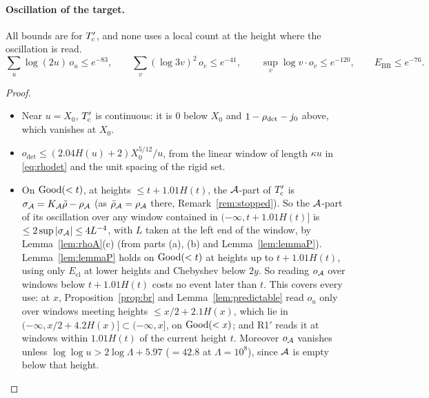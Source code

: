 \paragraph{Oscillation of the target.}\label{par:osc} All bounds are for $T'_{\mathrm{c}}$, and none uses a local count at the height where
the oscillation is read.
\begin{equation}\label{eq:osc}
  \sum_u\log(2u)\,o_u\le e^{-83},\qquad\sum_v(\log3v)^2\,o_v\le e^{-41},\qquad\sup_v\log v\cdot o_v\le e^{-120},
  \qquad E_{\mathrm{BR}}\le e^{-76}.
\end{equation}
\begin{proof}
\begin{itemize}
\item Near $u=X_0$, $T'_{\mathrm{c}}$ is continuous: it is $0$ below $X_0$ and $1-\rho_{\mathrm{det}}-j_0$ above, which vanishes at $X_0$.
\item $o_{\mathrm{det}}\le(2.04H(u)+2)X_0^{5/12}/u$, from the linear window of length $\kappa u$ in \eqref{eq:rhodet} and the
  unit spacing of the rigid set.
\item On $\mathrm{Good}(<t)$, at heights $\le t+1.01H(t)$, the $\mathcal{A}$-part of $T'_{\mathrm{c}}$ is $\sigma_{\mathcal{A}}=K_{\mathcal{A}}\tilde\rho-\rho_{\mathcal{A}}$ (as
  $\bar\rho_{\mathcal{A}}=\rho_{\mathcal{A}}$ there, Remark~\ref{rem:stopped}). So the $\mathcal{A}$-part of its oscillation over any window contained in
  $(-\infty,t+1.01H(t)]$ is $\le2\sup|\sigma_{\mathcal{A}}|\le4L^{-4}$, with $L$ taken at the left end of the window, by
  Lemma~\ref{lem:rhoA}(c) (from parts (a), (b) and Lemma~\ref{lem:lemmaP}). Lemma~\ref{lem:lemmaP} holds on $\mathrm{Good}(<t)$ at
  heights up to $t+1.01H(t)$, using only $E_{\mathrm{cl}}$ at lower heights and Chebyshev below $2y$. So reading $o_{\mathcal{A}}$ over
  windows below $t+1.01H(t)$ costs no event later than $t$. This covers every use: at $x$, Proposition~\ref{prop:br} and
  Lemma~\ref{lem:predictable} read $o_u$ only over windows meeting heights $\le x/2+2.1H(x)$, which lie in
  $(-\infty,x/2+4.2H(x)]\subset(-\infty,x]$, on $\mathrm{Good}(<x)$; and R1$'$ reads it at windows within $1.01H(t)$ of the current height $t$. Moreover $o_{\mathcal{A}}$ vanishes unless
  $\log\log u>2\log\Lambda+5.97$ ($=42.8$ at $\Lambda=10^8$), since $\mathcal{A}$ is empty below that height.

\end{itemize}
\end{proof}
